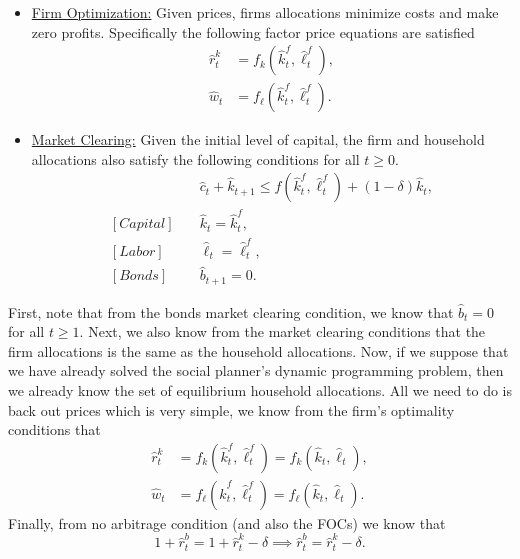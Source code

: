 \documentclass[11pt,english]{article}
\begin{document}
\begin{enumerate}
\begin{solution}
\begin{itemize}
\item \underline{Firm Optimization:} Given prices, firms allocations minimize costs and make zero profits. Specifically the following factor price equations are satisfied
\begin{align*}
\hat{r}_t^k &= f_k\left(\hat{k}_t^f, \hat{\ell}_t^f\right),\\
\hat{w}_t &= f_\ell\left(\hat{k}_t^f, \hat{\ell}_t^f\right).
\end{align*}

\item \underline{Market Clearing:} Given the initial level of capital, the firm and household allocations also satisfy the following conditions for all $t\geq 0$.
\begin{align*}
[Goods]&\quad \hat{c}_t + \hat{k}_{t+1} \leq f\left(\hat{k}_t^f, \hat{\ell}_t^f\right) + (1 - \delta)\hat{k}_t,\\
[Capital]&\quad \hat{k}_t = \hat{k}_t^f,\\
[Labor]&\quad \hat{\ell}_t = \hat{\ell}_t^f,\\
[Bonds]&\quad \hat{b}_{t+1} = 0.
\end{align*}
\end{itemize}

First, note that from the bonds market clearing condition, we know that $\hat{b}_{t} = 0$ for all $t\geq 1$. Next, we also know from the market clearing conditions that the firm allocations is the same as the household allocations. Now, if we suppose that we have already solved the social planner's dynamic programming problem, then we already know the set of equilibrium household allocations. All we need to do is back out prices which is very simple, we know from the firm's optimality conditions that 
\begin{align*}
\hat{r}_t^k &= f_k\left(\hat{k}_t^f, \hat{\ell}_t^f\right) = f_k\left(\hat{k}_t, \hat{\ell}_t\right),\\
\hat{w}_t &= f_\ell\left(\hat{k}_t^f, \hat{\ell}_t^f\right) =  f_\ell\left(\hat{k}_t, \hat{\ell}_t\right).
\end{align*} Finally, from no arbitrage condition (and also the FOCs) we know that $$1 + \hat{r}_t^b = 1 + \hat{r}_t^k - \delta \implies \hat{r}_t^b = \hat{r}_t^k - \delta.$$
    \end{solution}
 

\end{enumerate}
\end{document}
